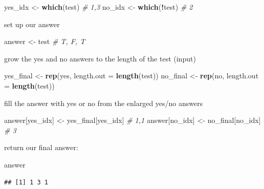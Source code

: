\documentclass[]{book}
\newenvironment{Shaded}{\begin{snugshade}}{\end{snugshade}}
\newcommand{\CommentTok}[1]{\textcolor[rgb]{0.56,0.35,0.01}{\textit{#1}}}
\newcommand{\DataTypeTok}[1]{\textcolor[rgb]{0.13,0.29,0.53}{#1}}
\newcommand{\KeywordTok}[1]{\textcolor[rgb]{0.13,0.29,0.53}{\textbf{#1}}}
\newcommand{\NormalTok}[1]{#1}
\newcommand{\OperatorTok}[1]{\textcolor[rgb]{0.81,0.36,0.00}{\textbf{#1}}}
\newcommand{\StringTok}[1]{\textcolor[rgb]{0.31,0.60,0.02}{#1}}
\begin{document}
\begin{Shaded}
\begin{Highlighting}[]
\NormalTok{yes_idx <-}\StringTok{ }\KeywordTok{which}\NormalTok{(test) }\CommentTok{# 1,3}
\NormalTok{no_idx <-}\StringTok{ }\KeywordTok{which}\NormalTok{(}\OperatorTok{!}\NormalTok{test) }\CommentTok{# 2}
\end{Highlighting}
\end{Shaded}

set up our answer

\begin{Shaded}
\begin{Highlighting}[]
\NormalTok{answer <-}\StringTok{ }\NormalTok{test }\CommentTok{# T, F, T}
\end{Highlighting}
\end{Shaded}

grow the yes and no answers to the length of the test (input)

\begin{Shaded}
\begin{Highlighting}[]
\NormalTok{yes_final <-}\StringTok{ }\KeywordTok{rep}\NormalTok{(yes, }\DataTypeTok{length.out =} \KeywordTok{length}\NormalTok{(test))}
\NormalTok{no_final <-}\StringTok{ }\KeywordTok{rep}\NormalTok{(no, }\DataTypeTok{length.out =} \KeywordTok{length}\NormalTok{(test))}
\end{Highlighting}
\end{Shaded}

fill the answer with yes or no from the enlarged yes/no answers

\begin{Shaded}
\begin{Highlighting}[]
\NormalTok{answer[yes_idx] <-}\StringTok{ }\NormalTok{yes_final[yes_idx]  }\CommentTok{# 1,1}
\NormalTok{answer[no_idx] <-}\StringTok{ }\NormalTok{no_final[no_idx]     }\CommentTok{# 3}
\end{Highlighting}
\end{Shaded}

return our final answer:

\begin{Shaded}
\begin{Highlighting}[]
\NormalTok{answer}
\end{Highlighting}
\end{Shaded}

\begin{verbatim}
## [1] 1 3 1
\end{verbatim}
\end{document}
